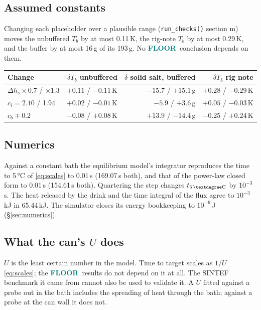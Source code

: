 \documentclass[11pt,a4paper]{article}
\newcommand{\code}[1]{\texttt{#1}}
\newcommand{\FLOOR}{\textcolor{teal}{\textsf{\bfseries FLOOR}}}
\begin{document}
\subsection{Assumed constants}
Changing each placeholder over a plausible range (\code{run\_checks()} section m) moves the unbuffered
$T_b$ by at most 0.11\,K, the rig-note $T_b$ by at most 0.29\,K, and the buffer by at most 16\,g of its
193\,g. No \FLOOR\ conclusion depends on them.

\begin{center}\small
\begin{tabular}{@{}l r r r@{}}
\toprule
Change & $\delta T_b$ unbuffered & $\delta$ solid salt, buffered & $\delta T_b$ rig note \\ \midrule
$\Delta h_s \times 0.7$ / $\times 1.3$ & $+0.11$ / $-0.11$\,K & $-15.7$ / $+15.1$\,g & $+0.28$ / $-0.29$\,K \\
$c_i = 2.10$ / 1.94 & $+0.02$ / $-0.01$\,K & $-5.9$ / $+3.6$\,g & $+0.05$ / $-0.03$\,K \\
$c_b \mp 0.2$ & $-0.08$ / $+0.08$\,K & $+13.9$ / $-14.4$\,g & $-0.25$ / $+0.24$\,K \\
\bottomrule
\end{tabular}
\end{center}

\subsection{Numerics}
Against a constant bath the equilibrium model's integrator reproduces the time to 5\,°C of
\eqref{eq:scales} to 0.01\,s (169.07\,s both), and that of the power-law closed form to 0.01\,s
(154.61\,s both).
Quartering the step changes $t_{5\,°\text C}$ by $10^{-3}$\,s. The heat released by the drink and the time
integral of the flux agree to $10^{-3}$\,kJ in 65.44\,kJ. The simulator closes its energy bookkeeping to
$10^{-9}$\,J (§\ref{sec:numerics}).

\subsection{What the can's $U$ does}
$U$ is the least certain number in the model. Time to target scales as $1/U$ \eqref{eq:scales}; the
\FLOOR\ results do not depend on it at all. The SINTEF benchmark it came from cannot also be used to
validate it. A $U$ fitted against a probe out in the bath includes the spreading of heat through the
bath; against a probe at the can wall it does not.
\end{document}
